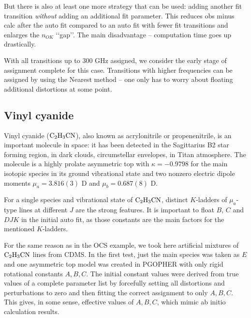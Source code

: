 \documentclass[11pt]{article}
\begin{document}
But there is also at least one more strategy that can be used: adding another fit transition \emph{without} adding an additional fit parameter. This reduces obs minus calc after the auto fit compared to an auto fit with fewer fit transitions and enlarges the $n_{OK}$ \lq\lq{}gap\rq\rq{}. The main disadvantage -- computation time goes up drastically. %

With all transitions up to 300 GHz assigned, we consider the early stage of assignment complete for this case. Transitions with higher frequencies can be assigned by using the Nearest method -- one only has to worry about floating additional distortions at some point. 

\subsection{Vinyl cyanide}

Vinyl cyanide ($\rm C_2H_3CN$), also known as acrylonitrile or propenenitrile, is an important molecule in space: it has been detected in the Sagittarius B2 star forming region, in dark clouds, circumstellar envelopes, in Titan atmosphere. The molecule is a highly prolate asymmetric top with $\kappa = -0.9798$ for the main isotopic species in its ground vibrational state and two nonzero electric dipole moments $\mu_a = 3.816(3)$ D and $\mu_b = 0.687(8)$ D.  

For a single species and vibrational state of $\rm C_2H_3CN$, 
distinct $K$-ladders of $\mu_a$-type lines at different $J$ are the strong features. %
It is important to float $B$, $C$ and $DJK$ in the initial auto fit, as those constants are the main factors for the mentioned $K$-ladders. 


For the same reason as in the OCS example, we took here artificial mixtures of $\rm C_2H_3CN$ lines from CDMS. In the first test, just the main species was taken as $E$ and one asymmetric top model was created in PGOPHER with only rigid rotational constants $A, B, C$. The initial constant values were derived from true values of a complete parameter list by forcefully setting all distortions and perturbations to zero and then fitting the correct assignment to only $A, B, C$. This gives, in some sense, effective values of $A, B, C$, which mimic ab initio calculation results. %
\end{document}
